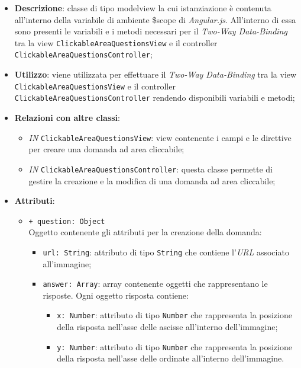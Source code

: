 \begin{itemize}
	\item \textbf{Descrizione}: classe di tipo modelview la cui istanziazione è contenuta all'interno della variabile di ambiente \$scope di \textit{Angular.js}. All'interno di essa sono presenti le variabili e i metodi necessari per il \textit{Two-Way Data-Binding} tra la view \texttt{ClickableAreaQuestionsView} e il controller \texttt{ClickableAreaQuestionsController}; 
	\item \textbf{Utilizzo}: viene utilizzata per effettuare il \textit{Two-Way Data-Binding} tra la view \texttt{ClickableAreaQuestionsView} e il controller \texttt{ClickableAreaQuestionsController} rendendo disponibili variabili e metodi;
	\item \textbf{Relazioni con altre classi}:
	\begin{itemize}
		\item \textit{IN} \texttt{ClickableAreaQuestionsView}: view contenente i campi e le direttive per creare una domanda ad area cliccabile; 
		\item \textit{IN} \texttt{ClickableAreaQuestionsController}: questa classe permette di gestire la creazione e la modifica di una domanda ad area cliccabile;
	\end{itemize}
	\item \textbf{Attributi}:
	\begin{itemize}
			\item \texttt{+ question: Object} \\ Oggetto contenente gli attributi per la creazione della domanda:
			\begin{itemize}
				\item \texttt{url: String}: attributo di tipo \texttt{String} che contiene l'\textit{URL} associato all'immagine;
				\item \texttt{answer: Array}: array contenente oggetti che rappresentano le risposte. Ogni oggetto risposta contiene:
				\begin{itemize}
					\item \texttt{x: Number}: attributo di tipo \texttt{Number} che rappresenta la posizione della risposta nell'asse delle ascisse all'interno dell'immagine;
					\item \texttt{y: Number}: attributo di tipo \texttt{Number} che rappresenta la posizione della risposta nell'asse delle ordinate all'interno dell'immagine.
				\end{itemize}
	\end{itemize}

\end{itemize}
\end{itemize}
